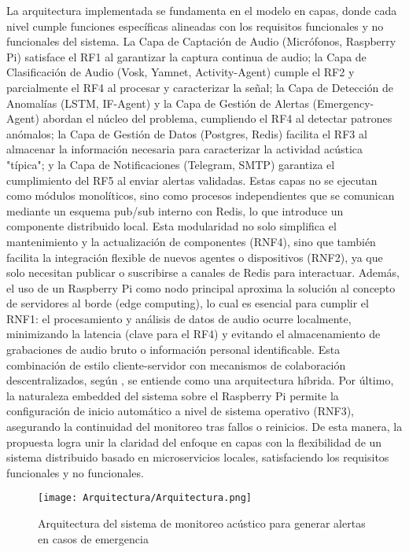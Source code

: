 La arquitectura implementada se fundamenta en el modelo en capas, donde cada nivel cumple funciones específicas alineadas con los requisitos funcionales y no funcionales del sistema. La Capa de Captación de Audio (Micrófonos, Raspberry Pi) satisface el RF1 al garantizar la captura continua de audio; la Capa de Clasificación de Audio (Vosk, Yamnet, Activity-Agent) cumple el RF2 y parcialmente el RF4 al procesar y caracterizar la señal; la Capa de Detección de Anomalías (LSTM, IF-Agent) y la Capa de Gestión de Alertas (Emergency-Agent) abordan el núcleo del problema, cumpliendo el RF4 al detectar patrones anómalos; la Capa de Gestión de Datos (Postgres, Redis) facilita el RF3 al almacenar la información necesaria para caracterizar la actividad acústica "típica"; y la Capa de Notificaciones (Telegram, SMTP) garantiza el cumplimiento del RF5 al enviar alertas validadas. Estas capas no se ejecutan como módulos monolíticos, sino como procesos independientes que se comunican mediante un esquema pub/sub interno con Redis, lo que introduce un componente distribuido local. Esta modularidad no solo simplifica el mantenimiento y la actualización de componentes (RNF4), sino que también facilita la integración flexible de nuevos agentes o dispositivos (RNF2), ya que solo necesitan publicar o suscribirse a canales de Redis para interactuar. Además, el uso de un Raspberry Pi como nodo principal aproxima la solución al concepto de servidores al borde (edge computing), lo cual es esencial para cumplir el RNF1: el procesamiento y análisis de datos de audio ocurre localmente, minimizando la latencia (clave para el RF4) y evitando el almacenamiento de grabaciones de audio bruto o información personal identificable. Esta combinación de estilo cliente-servidor con mecanismos de colaboración descentralizados, según \citeauthor{tanenbaum2007distributed} \citeyear{tanenbaum2007distributed}, se entiende como una arquitectura híbrida. Por último, la naturaleza embedded del sistema sobre el Raspberry Pi permite la configuración de inicio automático a nivel de sistema operativo (RNF3), asegurando la continuidad del monitoreo tras fallos o reinicios. De esta manera, la propuesta logra unir la claridad del enfoque en capas con la flexibilidad de un sistema distribuido basado en microservicios locales, satisfaciendo los requisitos funcionales y no funcionales.

\begin{figure}[ht!]
      \centering
      \texttt{[image: Arquitectura/Arquitectura.png]}
      \caption{Arquitectura del sistema de monitoreo acústico para generar alertas en casos de emergencia}
      \label{fig:arquitectura}
\end{figure}

